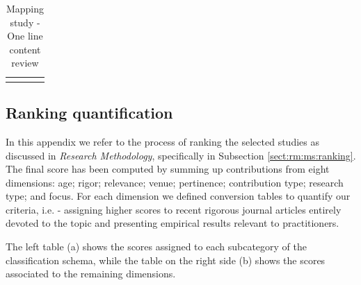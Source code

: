 \documentclass[final,5p,times,twocolumn]{elsarticle}
\begin{document}
\begin{longtable}{|p{0.2in}|p{0.8in}|p{2.5in}|p{1.4in}|}
\hline 
\hline 

 \caption{ Mapping study - One line content review }\label{tab:ms:oneline}\\
\end{longtable}
\small
\twocolumn



\subsection{Ranking quantification}
\label{sub:a_ranking}


In this appendix we refer to the process of ranking the selected studies as discussed in \textit{Research Methodology}, specifically in Subsection \ref{sect:rm:ms:ranking}. The final score has been computed by summing up contributions from eight dimensions: age; rigor; relevance; venue; pertinence; contribution type; research type; and focus. For each dimension we defined conversion tables to quantify our criteria, i.e. - assigning  higher scores to recent rigorous journal articles entirely devoted to the topic and presenting empirical results relevant to practitioners.

The left table (a) shows the scores assigned to each subcategory of the classification schema, while the table on the right side (b) shows the scores associated to the remaining dimensions.
\end{document}
